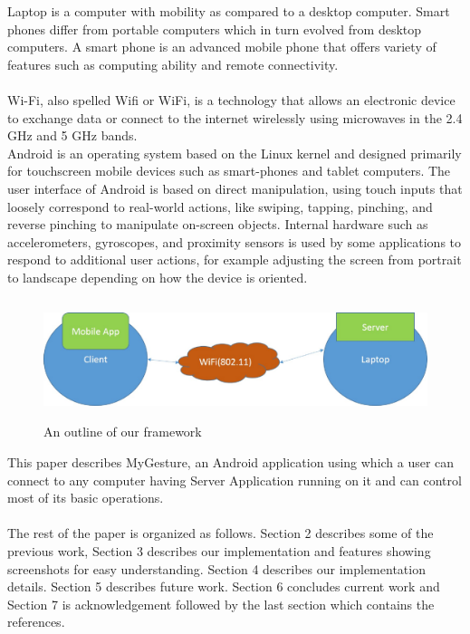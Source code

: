 \documentclass[10pt,conference,letterpaper]{IEEEtran}
\begin{document}
Laptop is a computer with mobility as compared to a desktop computer. Smart phones differ from portable computers which in turn evolved from desktop computers. A smart phone is an advanced mobile phone that offers variety of features such as computing ability and remote connectivity.\\\\ Wi-Fi, also spelled Wifi or WiFi, is a technology that allows an electronic device to exchange data or connect to the internet wirelessly using microwaves in the 2.4 GHz and 5 GHz bands.\\ Android is an operating system based on the Linux kernel and designed primarily for touchscreen mobile devices such as smart-phones and tablet computers. The user interface of Android is based on direct manipulation, using touch inputs that loosely correspond to real-world actions, like swiping, tapping, pinching, and reverse pinching to manipulate on-screen objects. Internal hardware such as accelerometers, gyroscopes, and proximity sensors is used by some applications to respond to additional user actions, for example adjusting the screen from portrait to landscape depending on how the device is oriented.
\begin{figure}
\centering
\includegraphics[width=120mm,height=35mm]{1.eps}
\caption{An outline of our framework}
\end{figure} 

This paper describes MyGesture, an Android application using which a user can connect to any computer having Server Application running on it and can control most of its basic operations.\\\\
The rest of the paper is organized as follows. Section 2 describes some of the previous work, Section 3 describes our implementation and features showing screenshots for easy understanding. Section 4 describes our implementation details. Section 5 describes future work. Section 6 concludes current work and Section 7 is acknowledgement followed by the last section which contains the references.
\end{document}
